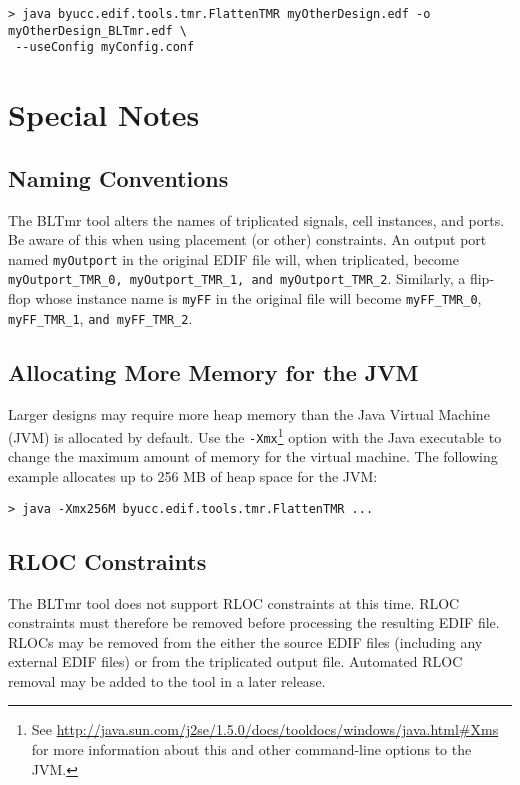 \documentclass[english]{article}
\begin{document}
\begin{verbatim}
> java byucc.edif.tools.tmr.FlattenTMR myOtherDesign.edf -o myOtherDesign_BLTmr.edf \
 --useConfig myConfig.conf
\end{verbatim}

\section{Special Notes}

\subsection{Naming Conventions}
\label{naming conventions}
The BLTmr tool alters the names of triplicated signals, cell instances, and 
ports. Be aware of this when using placement (or other) constraints. An output 
port named \texttt{myOutport} in the original EDIF file will, when triplicated, 
become \texttt{myOutport\_TMR\_0, myOutport\_TMR\_1, and myOutport\_TMR\_2}. 
Similarly, a flip-flop whose instance name is \texttt{myFF} in the original file
will become \texttt{myFF\_TMR\_0}, \texttt{myFF\_TMR\_1}, 
\texttt{and myFF\_TMR\_2}.

\subsection{Allocating More Memory for the JVM}
Larger designs may require more heap memory than the Java Virtual Machine (JVM) 
is allocated by default. Use the \texttt{-Xmx}\footnote{See
\url{http://java.sun.com/j2se/1.5.0/docs/tooldocs/windows/java.html\#Xms} for
more information about this and other command-line options to the JVM.} option 
with the Java executable to change the maximum amount of memory for the virtual
machine. The following example allocates up to 256 MB of heap space for the JVM:

\begin{verbatim}
> java -Xmx256M byucc.edif.tools.tmr.FlattenTMR ...
\end{verbatim}

\subsection{RLOC Constraints}
The BLTmr tool does not support RLOC constraints at this time. RLOC constraints 
must therefore be removed before processing the resulting EDIF file. RLOCs may 
be removed from the either the source EDIF files (including any external EDIF 
files) or from the triplicated output file. Automated RLOC removal may be added 
to the tool in a later release.
\end{document}
